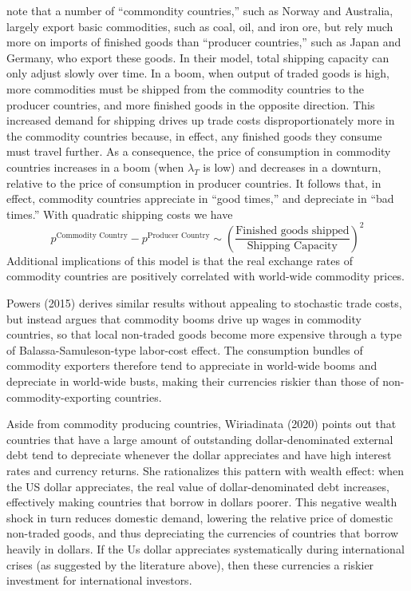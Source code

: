 \documentclass{ar-1col}
\begin{document}
\citet{Readyetal2013} note that a number of ``commondity countries,'' such as Norway and Australia, largely export basic commodities, such as coal, oil, and iron ore, but rely much more on imports of finished goods than ``producer countries,'' such as Japan and Germany, who export these goods. In their model, total shipping capacity can only adjust slowly over time. In a boom, when output of traded goods is high, more commodities must be shipped from the commodity countries to the producer countries, and more finished goods in the opposite direction. This increased demand for shipping drives up trade costs disproportionately more in the commodity countries because, in effect, any finished goods they consume must travel further. As a consequence, the price of consumption in commodity countries increases in a boom (when $\lambda_T$ is low) and decreases in a downturn, relative to the price of consumption in producer countries. It follows that, in effect, commodity countries appreciate in ``good times,'' and depreciate in ``bad times.'' With quadratic shipping costs we have
\begin{equation*}
  p^{\text{Commodity Country}}-p^{\text{Producer Country}}\sim\left(\frac{\text{Finished goods shipped}}{\text{Shipping Capacity}}\right)^2
\end{equation*}
Additional implications of this model is that the real exchange rates of commodity countries are positively correlated with world-wide commodity prices. 

Powers (2015) derives similar results without appealing to stochastic trade costs, but instead argues that commodity booms drive up wages in commodity countries, so that local non-traded goods become more expensive through a type of Balassa-Samuleson-type labor-cost effect. The consumption bundles of commodity exporters therefore tend to appreciate in world-wide booms and depreciate in world-wide busts, making their currencies riskier than those of non-commodity-exporting countries.

Aside from commodity producing countries, Wiriadinata (2020) points out that countries that have a large amount of outstanding dollar-denominated external debt tend to depreciate whenever the dollar appreciates and have high interest rates and currency returns. She rationalizes this pattern with wealth effect: when the US dollar appreciates, the real value of dollar-denominated debt increases, effectively making countries that borrow in dollars poorer. This negative wealth shock in turn reduces domestic demand, lowering the relative price of domestic non-traded goods, and thus depreciating the currencies of countries that borrow heavily in dollars. If the Us dollar appreciates systematically during international crises (as suggested by the literature above), then these currencies a riskier investment for international investors.
\end{document}
